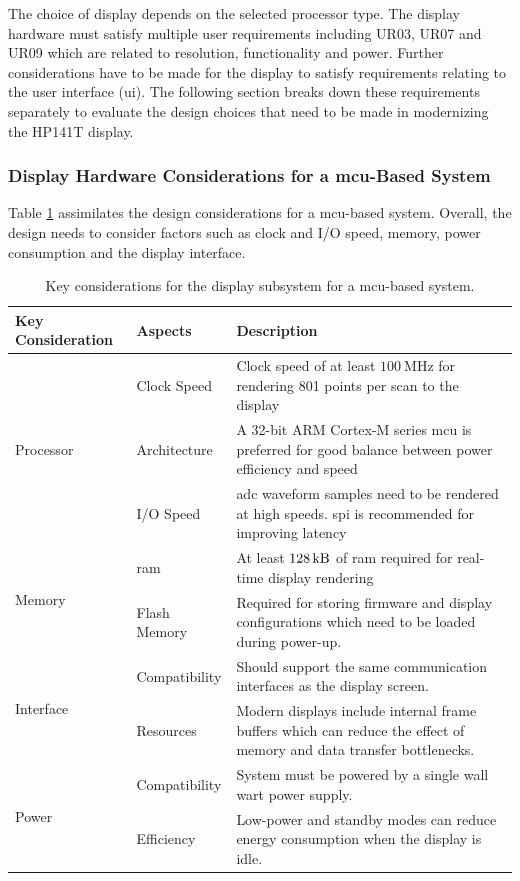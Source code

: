 \documentclass[class=report,11pt,crop=false]{standalone}
\begin{document}
	The choice of display depends on the selected processor type. The display hardware must satisfy multiple user requirements including UR03, UR07 and UR09 which are related to resolution, functionality and power. Further considerations have to be made for the display to satisfy requirements relating to the user interface (\acrshort{ui}). The following section breaks down these requirements separately to evaluate the design choices that need to be made in modernizing the HP141T display.
	
	\subsubsection{Display Hardware Considerations for a \acrshort{mcu}-Based System}
	
	Table \ref{tab:mcu-display-options} assimilates the design considerations for a \acrshort{mcu}-based system. Overall, the design needs to consider factors such as clock and I/O speed, memory, power consumption and the display interface.
	
	\begin{table}[ht!]
		\centering
		\begin{tabular}{|m{5em}|m{10em}|m{24em}|}
			\hline
			\cellcolor{cyan!25}\textbf{Key Consideration}	&	\cellcolor{cyan!25}\textbf{Aspects}	& \cellcolor{cyan!25}\textbf{Description}\\
			\hline
			\multirow{3}{*}{Processor}	& Clock Speed	& Clock speed of at least $\SI{100}{\mega\hertz}$ for rendering 801 points per scan to the display\\
			\cline{2-3}
			&	Architecture &	A 32-bit ARM Cortex-M series \acrshort{mcu} is preferred for good balance between power efficiency and speed\\
			\cline{2-3}
			&	I/O Speed & \acrshort{adc} waveform samples need to be rendered at high speeds. \acrshort{spi} is recommended for improving latency\\
			\hline
			\multirow{2}{*}{Memory}	& 	\acrshort{ram}	& At least $\SI{128}{\kilo\byte}$ of \acrshort{ram} required for real-time display rendering\\
			\cline{2-3}
			&	Flash Memory	&	Required for storing firmware and display configurations which need to be loaded during power-up.\\
			\hline
			\multirow{2}{*}{Interface}	&	Compatibility	& Should support the same communication interfaces as the display screen.\\
			\cline{2-3}
			&	Resources &	Modern displays include internal frame buffers which can reduce the effect of memory and data transfer bottlenecks.\\
			\hline
			\multirow{2}{*}{Power}	&	Compatibility & System must be powered by a single wall wart power supply.\\
			\cline{2-3}
			&	Efficiency	&	Low-power and standby modes can reduce energy consumption when the display is idle.\\
			\hline
		\end{tabular}
		\caption{Key considerations for the display subsystem for a \acrshort{mcu}-based system.}
		\label{tab:mcu-display-options}
	\end{table}
	
\end{document}
